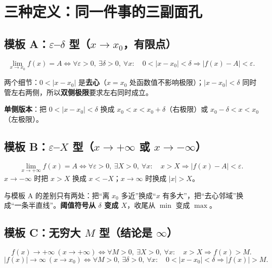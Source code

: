 \documentclass[11pt,a4paper]{ctexart}
\newcommand{\eps}{\varepsilon}
\newcommand{\abs}[1]{\left\lvert #1\right\rvert}
\begin{document}
\section{三种定义：同一件事的三副面孔}

\subsection{模板 A：$\eps$--$\delta$ 型（$x\to x_0$，有限点）}

\begin{keypoint}[定义 A]
\[
\lim_{x\to x_0}f(x)=A
\iff
\forall \eps>0,\ \exists \delta>0,\ \forall x:\quad 0<\abs{x-x_0}<\delta \Rightarrow \abs{f(x)-A}<\eps .
\]
\end{keypoint}

两个细节：$0<\abs{x-x_0}$ 是\textbf{去心}（$x=x_0$ 处函数值不影响极限）；$\abs{x-x_0}<\delta$ 同时管左右两侧，所以\textbf{双侧极限}要求左右同时成立。

\textbf{单侧版本}：把 $0<\abs{x-x_0}<\delta$ 换成 $x_0<x<x_0+\delta$（右极限）或 $x_0-\delta<x<x_0$（左极限）。

\subsection{模板 B：$\eps$--$X$ 型（$x\to+\infty$ 或 $x\to-\infty$）}

\begin{keypoint}[定义 B]
\[
\lim_{x\to+\infty}f(x)=A
\iff
\forall \eps>0,\ \exists X>0,\ \forall x:\quad x>X \Rightarrow \abs{f(x)-A}<\eps .
\]
$x\to-\infty$ 时把 $x>X$ 换成 $x<-X$；$x\to\infty$ 时换成 $\abs{x}>X$。
\end{keypoint}

与模板 A 的差别只有两处：把“离 $x_0$ 多近”换成“$x$ 有多大”，把“去心邻域”换成“一条半直线”。\textbf{阈值符号从 $\delta$ 变成 $X$}，收尾从 $\min$ 变成 $\max$。

\subsection{模板 C：无穷大 $M$ 型（结论是 $\infty$）}

\begin{keypoint}[定义 C]
\[
f(x)\to+\infty\ (x\to+\infty)
\iff
\forall M>0,\ \exists X>0,\ \forall x:\quad x>X \Rightarrow f(x)>M .
\]
\[
\abs{f(x)}\to\infty\ (x\to x_0)
\iff
\forall M>0,\ \exists \delta>0,\ \forall x:\quad 0<\abs{x-x_0}<\delta \Rightarrow \abs{f(x)}>M .
\]
\end{keypoint}
\end{document}
